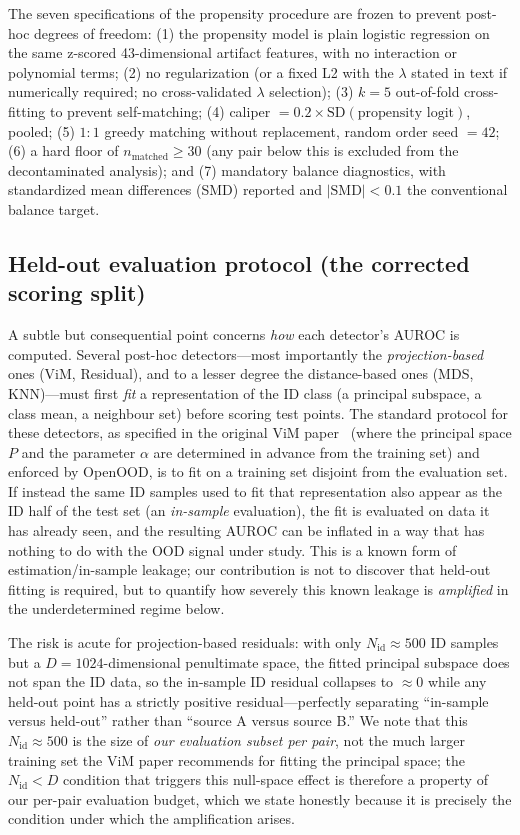 \documentclass{article}
\begin{document}
The seven specifications of the propensity procedure are frozen to prevent
post-hoc degrees of freedom: (1) the propensity model is plain logistic
regression on the same z-scored 43-dimensional artifact features, with no
interaction or polynomial terms; (2) no regularization (or a fixed L2 with the
$\lambda$ stated in text if numerically required; no cross-validated $\lambda$
selection); (3) $k=5$ out-of-fold cross-fitting to prevent self-matching;
(4) caliper $= 0.2 \times \mathrm{SD}(\text{propensity logit})$, pooled;
(5) $1{:}1$ greedy matching without replacement, random order seed $=42$;
(6) a hard floor of $n_\text{matched} \ge 30$ (any pair below this is excluded
from the decontaminated analysis); and (7) mandatory balance diagnostics, with
standardized mean differences (SMD) reported and $|\text{SMD}|<0.1$ the
conventional balance target.

\subsection{Held-out evaluation protocol (the corrected scoring split)}
\label{sec:heldout}

A subtle but consequential point concerns \emph{how} each detector's AUROC is
computed. Several post-hoc detectors---most importantly the \emph{projection-based}
ones (ViM, Residual), and to a lesser degree the distance-based ones (MDS,
KNN)---must first \emph{fit} a representation of the ID class (a principal
subspace, a class mean, a neighbour set) before scoring test points. The standard
protocol for these detectors, as specified in the original ViM
paper~\citep{wang2022vim} (where the principal space $P$ and the parameter
$\alpha$ are determined in advance from the training set) and enforced by
OpenOOD, is to fit on a training set disjoint from the evaluation set. If instead
the same ID samples used to fit that representation also appear as the ID half of
the test set (an \emph{in-sample} evaluation), the fit is evaluated on data it
has already seen, and the resulting AUROC can be inflated in a way that has
nothing to do with the OOD signal under study. This is a known form of
estimation/in-sample leakage; our contribution is not to discover that held-out
fitting is required, but to quantify how severely this known leakage is
\emph{amplified} in the underdetermined regime below.

The risk is acute for projection-based residuals: with only $N_\text{id} \approx
500$ ID samples but a $D = 1024$-dimensional penultimate space, the fitted
principal subspace does not span the ID data, so the in-sample ID residual
collapses to $\approx 0$ while any held-out point has a strictly positive
residual---perfectly separating ``in-sample versus held-out'' rather than
``source A versus source B.'' We note that this $N_\text{id} \approx 500$ is the
size of \emph{our evaluation subset per pair}, not the much larger training set
the ViM paper recommends for fitting the principal space; the $N_\text{id} < D$
condition that triggers this null-space effect is therefore a property of our
per-pair evaluation budget, which we state honestly because it is precisely the
condition under which the amplification arises.
\end{document}
